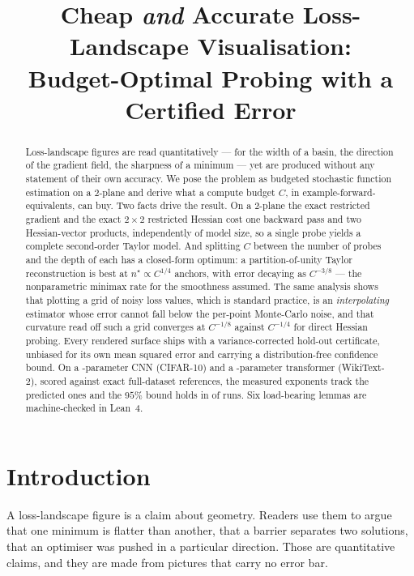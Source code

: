 \documentclass[11pt]{article}
\title{\bf Cheap \emph{and} Accurate Loss-Landscape Visualisation:\\
Budget-Optimal Probing with a Certified Error}
\author{}
\date{}
\theoremstyle{definition}
\begin{document}
\maketitle

\begin{abstract}
\noindent
Loss-landscape figures are read quantitatively --- for the width of a basin, the
direction of the gradient field, the sharpness of a minimum --- yet are produced without
any statement of their own accuracy. We pose the problem as budgeted stochastic function
estimation on a $2$-plane and derive what a compute budget $C$, in
example-forward-equivalents, can buy. Two facts drive the result. On a $2$-plane the
exact restricted gradient and the exact $2\times2$ restricted Hessian cost one backward
pass and two Hessian-vector products, independently of model size, so a single probe
yields a complete second-order Taylor model. And splitting $C$ between the number of
probes and the depth of each has a closed-form optimum: a partition-of-unity Taylor
reconstruction is best at $n^\star\!\propto\! C^{1/4}$ anchors, with error decaying as
$C^{-3/8}$ --- the nonparametric minimax rate for the smoothness assumed. The same
analysis shows that plotting a grid of noisy loss values, which is standard practice, is
an \emph{interpolating} estimator whose error cannot fall below the per-point
Monte-Carlo noise, and that curvature read off such a grid converges at $C^{-1/8}$
against $C^{-1/4}$ for direct Hessian probing. Every rendered surface ships with a
variance-corrected hold-out certificate, unbiased for its own mean squared error and
carrying a distribution-free confidence bound. On a \CNNparams-parameter CNN (CIFAR-10)
and a \GPTparams-parameter transformer (WikiText-2), scored against exact full-dataset
references, the measured exponents track the predicted ones and the $95\%$ bound holds
in \Coverage{} of runs. Six load-bearing lemmas are machine-checked in Lean~4.
\end{abstract}

\section{Introduction}
\label{sec:intro}

A loss-landscape figure is a claim about geometry. Readers use them to argue that one
minimum is flatter than another, that a barrier separates two solutions, that an
optimiser was pushed in a particular direction. Those are quantitative claims, and they
are made from pictures that carry no error bar.
\end{document}
